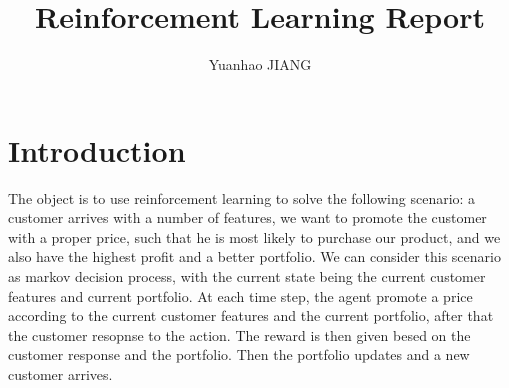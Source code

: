 \documentclass[11pt]{article}
\title{Reinforcement Learning Report}
\author{Yuanhao JIANG}
\date{}
\begin{document}
\maketitle
\tableofcontents

\section{Introduction}
The object is to use reinforcement learning to solve the following scenario:
a customer arrives with a number of features, we want to promote the customer
with a proper price, such that he is most likely to purchase our product, and 
we also have the highest profit and a better portfolio. 
\vspace{3mm}\newline We can consider this scenario as markov decision process,
with the current state being the current customer features and current 
portfolio. At each time step, the agent promote a price according to the 
current customer features and the current portfolio, after that the customer 
resopnse to the action. The reward is then given besed on the customer 
response and the portfolio. Then the portfolio updates and a new customer 
arrives.
\end{document}
